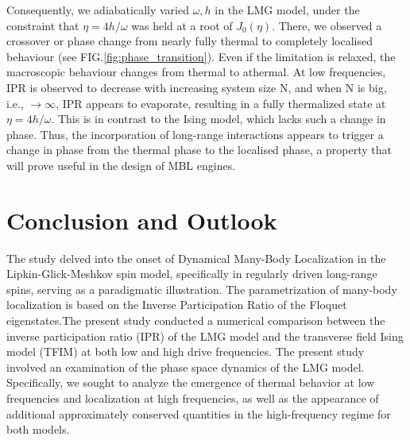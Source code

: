 \documentclass[%
reprint,
superscriptaddress,
amsmath,amssymb,
aps,
prb,
showkeys,
]{revtex4-2}
\begin{document}
	Consequently, we adiabatically varied $\omega, h$ in the LMG model, under the constraint that $\eta=4h/\omega$ was held at a root of $J_0(\eta)$. There, we observed a crossover or phase change from nearly fully thermal to completely localised behaviour (see FIG.\ref{fig:phase_transition}).
	Even if the limitation is relaxed, the macroscopic behaviour changes from thermal to athermal.
	At low frequencies, IPR is observed to decrease with increasing system size N, and when N is big, i.e., $\rightarrow{} \infty$, IPR appears to evaporate, resulting in a fully thermalized state at $\eta=4h/\omega$.
	This is in contrast to the Ising model, which lacks such a change in phase. Thus, the incorporation of long-range interactions appears to trigger a change in phase from the thermal phase to the localised phase, a property that will prove useful in the design of MBL engines. 
	
	\section{\label{sec:level7}Conclusion and Outlook}
	
	The study delved into the onset of Dynamical Many-Body Localization in the Lipkin-Glick-Meshkov spin model, specifically in regularly driven long-range spins, serving as a paradigmatic illustration. The parametrization of many-body localization is based on the Inverse Participation Ratio of the Floquet eigenstates.The present study conducted a numerical comparison between the inverse participation ratio (IPR) of the LMG model and the transverse field Ising model (TFIM) at both low and high drive frequencies. The present study involved an examination of the phase space dynamics of the LMG model. Specifically, we sought to analyze the emergence of thermal behavior at low frequencies and localization at high frequencies, as well as the appearance of additional approximately conserved quantities in the high-frequency regime for both models.
	
\end{document}
